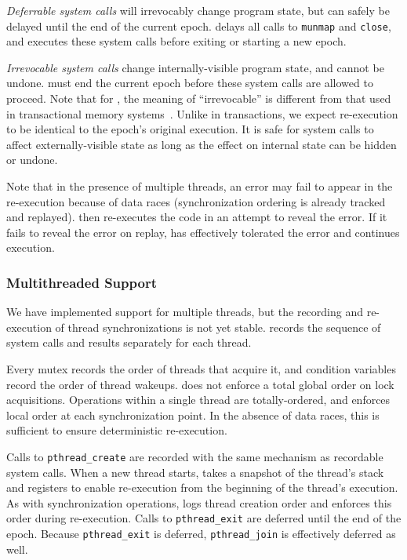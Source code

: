 \emph{Deferrable system calls} will irrevocably change program state, but can safely be delayed until the end of the current epoch. \doubletake{} delays all calls to \texttt{munmap} and \texttt{close}, and executes these system calls before exiting or starting a new epoch.
	
\emph{Irrevocable system calls} change internally-visible program state, and cannot be undone. \doubletake{} must end the current epoch before these system calls are allowed to proceed. Note that for \doubletake{}, the meaning of ``irrevocable'' is different from that used in transactional memory systems~\cite{Irrevocabletrans}. Unlike in transactions, we expect re-execution to be identical to the epoch's original execution. It is safe for system calls to affect externally-visible state as long as the effect on internal state can be hidden or undone.

Note that in the presence of multiple threads, an error may fail to appear in the re-execution because of data races (synchronization ordering is already tracked and replayed). \doubletake{} then re-executes the code in an attempt to reveal the error. If it fails to reveal the error on replay, \doubletake{} has effectively tolerated the error and continues execution.


\subsubsection*{Multithreaded Support}
We have implemented support for multiple threads, but the recording and re-execution of thread synchronizations is not yet stable. \doubletake{} records the sequence of system calls and results separately for each thread.

Every mutex records the order of threads that acquire it, and condition variables record the order of thread wakeups. \doubletake{} does not enforce a total global order on lock acquisitions. Operations within a single thread are totally-ordered, and \doubletake{} enforces local order at each synchronization point. In the absence of data races, this is sufficient to ensure deterministic re-execution.

Calls to \texttt{pthread\_create} are recorded with the same mechanism as recordable system calls. When a new thread starts, \doubletake{} takes a snapshot of the thread's stack and registers to enable re-execution from the beginning of the thread's execution. As with synchronization operations, \doubletake{} logs thread creation order and enforces this order during re-execution. Calls to \texttt{pthread\_exit} are deferred until the end of the epoch. Because \texttt{pthread\_exit} is deferred, \texttt{pthread\_join} is effectively deferred as well.

